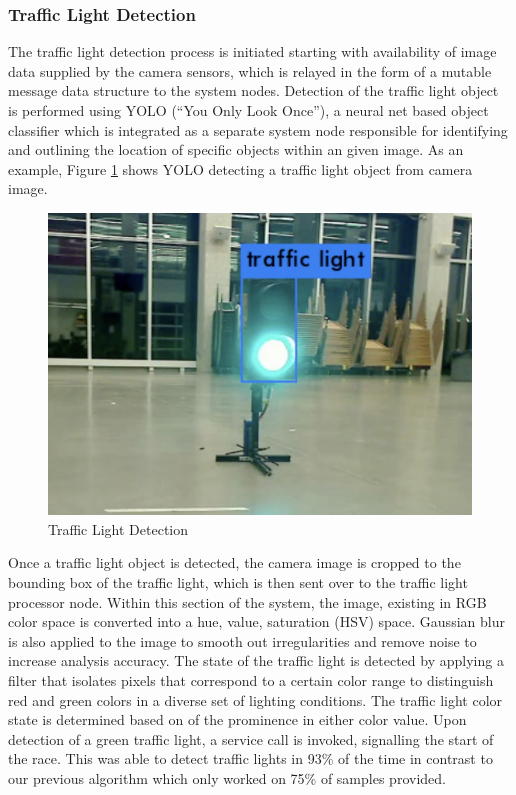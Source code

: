 \documentclass[11pt,journal]{IEEEtran}
\begin{document}
\subsubsection{Traffic Light Detection}
The traffic light detection process is initiated starting with availability of image data supplied by the camera sensors, which is relayed in the form of a mutable message data structure to the system nodes. Detection of the traffic light object is performed using YOLO (“You Only Look Once”)\cite{TrafLight}, a neural net based object classifier which is integrated as a separate system node responsible for identifying and outlining the location of specific objects within an given image. As an example, Figure \ref{TrafficLight} shows YOLO detecting a traffic light object from camera image.
\begin{figure}[ht]
\centerline{\includegraphics[width=0.9\columnwidth]{traffic_green.png}}
\caption{Traffic Light Detection}
\label{TrafficLight}
\end{figure}

Once a traffic light object is detected, the camera image is cropped to the bounding box of the traffic light, which is then sent over to the traffic light processor node. Within this section of the system, the image, existing in RGB color space is converted into a hue, value, saturation (HSV) space. Gaussian blur is also applied to the image to smooth out irregularities and remove noise to increase analysis accuracy. The state of the traffic light is detected by applying a filter that isolates pixels that correspond to a certain color range to distinguish red and green colors in a diverse set of lighting conditions. The traffic light color state is determined based on of the prominence in either color value. Upon detection of a green traffic light, a service call is invoked, signalling the start of the race. This was able to detect traffic lights in 93\% of the time in contrast to our previous algorithm which only worked on 75\% of samples provided.
\end{document}
